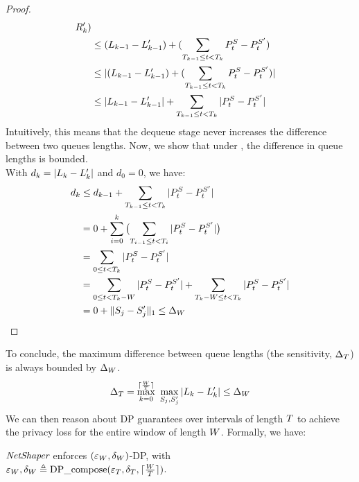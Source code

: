 \begin{proof}
\begin{align*}
    {R}_{k}')
    \\
    & \leq
    (L_{k-1} - L_{k-1}')
    +
    (\sum_{T_{k-1} \leq t < T_{k}}P^S_t - P^{S'}_t)
    \\
    & \leq
    |
    (L_{k-1} - L_{k-1}')
    +
    (\sum_{T_{k-1} \leq t < T_{k}}P^S_t - P^{S'}_t)
    |
    \\
    & \leq
    |L_{k-1} - L_{k-1}'|
    +
    \sum_{T_{k-1} \leq t < T_{k}}|P^S_t - P^{S'}_t|
    \end{align*}
    Intuitively, this means that the dequeue stage never increases the difference between two queues lengths.
    Now, we show that under , the difference in queue lengths is bounded.
    \\
    With $d_k = |L_{k}-L_{k}'|$ and $d_0 = 0$, we have:
    \begin{align}
    \nonumber
    & d_k \leq d_{k-1} + \sum_{T_{k-1} \leq t < T_{k}}|P^S_t - P^{S'}_t|\\
    &~~~=
    \nonumber
    0 + \sum_{i=0}^{k}\big({\sum_{T_{i-1} \leq t < T_{i}}|P^S_t - P^{S'}_t|}\big)\\
    &~~~=
    \nonumber
    \sum_{0 \leq t < T_{k}} |P^S_t - P^{S'}_t|\\
    \nonumber
    &~~~= \sum_{0 \leq t < T_k - W} |P^S_t - P^{S'}_t| +
    \sum_{T_{k} - W \leq t < T_{k}} |P^S_t - P^{S'}_t|\\
    \nonumber
    &~~~=
    0 + \|S_{j} - S_{j}'\|_1
    \leq
    \Delta_{W}
    \end{align}
\end{proof}
\noindent To conclude, the maximum difference between queue lengths (\ie the sensitivity,
$\Delta_T$) is always bounded by $\Delta_{W}$.
\begin{align}
        \Delta_T = \max_{k = 0}^{\lceil \frac{W}{T} \rceil}~\max_{S_{j},
        S_{j}'} | L_{k} - L_{k}' | \leq \Delta_{W}
\end{align}
We can then reason about DP guarantees over intervals of length $T$ to achieve the privacy loss for the entire window of length $W$.
%
Formally, we have:
\begin{proposition}\label{prop:dp}
    {$\textit{NetShaper}$} enforces $(\varepsilon_{W}, \delta_{W})$-DP, 
    with 
    \\
    $\varepsilon_{W}, \delta_{W} \triangleq 
    \textrm{DP\_compose}(\varepsilon_T, \delta_T, \lceil \frac{W}{T} \rceil)$.
\end{proposition}
